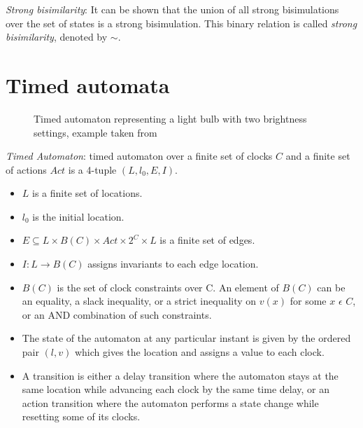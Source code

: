 \documentclass[a4paper]{llncs}
\begin{document}
\begin{definition}
  \emph{Strong bisimilarity}: It can be shown that the union of
  all strong bisimulations over the set of states is a strong
  bisimulation. This binary relation is called \textit{strong
    bisimilarity}, denoted by $\sim$.
\end{definition}

\section{Timed automata}

\begin{SCfigure}
  \centering

  \caption{Timed automaton representing a light bulb with two
    brightness settings, example taken from \cite{aceto2007reactive}}
\end{SCfigure}

\begin{definition}
  \emph{Timed Automaton}: timed automaton over a finite set of clocks $C$
  and a finite set of actions $Act$ is a 4-tuple $(L, l_{0}, E, I)$.
  \begin{itemize}
  \item $L$ is a finite set of locations.
  \item $l_{0}$ is the initial location.
  \item $E \subseteq L \times B(C) \times Act \times 2^{C} \times L$
    is a finite set of edges.
  \item $I: L \rightarrow B(C)$ assigns invariants to each edge
    location.
  \item $B(C)$ is the set of clock constraints over C. An element of $B(C)$
    can be an equality, a slack inequality, or a strict inequality on
    $v(x)$ for some $x$ $\epsilon$ $C$, or
    an AND combination of such constraints.
  \item The state of the automaton at any particular instant is given
    by the ordered pair $(l, v)$ which gives the location and assigns
    a value to each clock. 
  \item A transition is either a delay transition where the automaton
    stays at the same location while advancing each clock by the same
    time delay, or an action transition where the automaton performs a
    state change while resetting some of its clocks.
  \end{itemize}
\end{definition}
\end{document}
